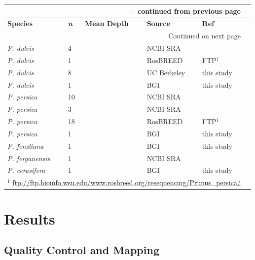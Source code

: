 \documentclass[12pt]{article}
\begin{document}
\begin{center}
\begin{longtable}{llllll}
\multicolumn{5}{r}{{\bfseries \tablename\ \thetable{} -- continued from previous page}} \\
\hline
\multicolumn{1}{l}{\textbf{Species}} &
\multicolumn{1}{l}{\textbf{\emph{n}}} &
\multicolumn{1}{l}{\textbf{Mean Depth}} &
\multicolumn{1}{l}{\textbf{Source}} &
\multicolumn{1}{l}{\textbf{Ref}} \\
\hline 
\endhead
%
\hline
\multicolumn{5}{r}{{Continued on next page}} \\
\hline \hline
\endfoot
%
\endlastfoot
%
	\emph{P. dulcis} &4 & &NCBI SRA &\citealt{koepke2013comparative}\\
	\emph{P. dulcis} &1 & &RosBREED &FTP$^{1}$\\
	\emph{P. dulcis} &8 & &UC Berkeley &this study \\
	\emph{P. dulcis} &1 & &BGI &this study\\
	\emph{P. persica} &10 & &NCBI SRA &\citealt{verde2013high} \\
	\emph{P. persica} &3 & &NCBI SRA &\citealt{ahmad2011whole} \\
	\emph{P. persica} &18 & &RosBREED &FTP$^{1}$ \\
	\emph{P. persica} &1 & &BGI &this study \\
	\emph{P. fenzliana} &1 & &BGI &this study\\
	\emph{P. ferganensis} &1 & &NCBI SRA &\citealt{verde2013high}\\
	\emph{P. cerasifera} &1 & &BGI &this study\\ \hline \hline
	\multicolumn{5}{l}{$^{1}$ \url{ftp://ftp.bioinfo.wsu.edu/www.rosbreed.org/resequencing/Prunus_persica/}}\\
\end{longtable}
\end{center}
%
%
\section*{Results}
\subsection*{Quality Control and Mapping}
\end{document}
